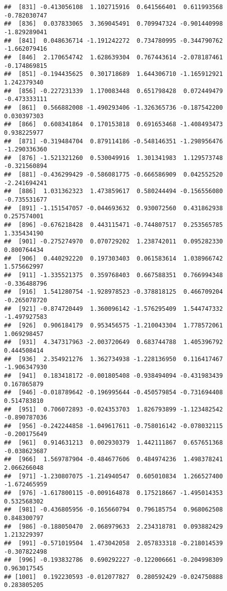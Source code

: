 \documentclass[
]{article}
\begin{document}
\begin{verbatim}
##  [831] -0.413056108  1.102715916  0.641566401  0.611993568 -0.782030747
##  [836]  0.037833065  3.369045491  0.709947324 -0.901440998 -1.829289041
##  [841]  0.048636714 -1.191242272  0.734780995 -0.344790762 -1.662079416
##  [846]  2.170654742  1.628639304  0.767443614 -2.078187461 -0.174869815
##  [851] -0.194435625  0.301718689  1.644306710 -1.165912921  1.242379340
##  [856] -0.227231339  1.170083448  0.651798428  0.072449479 -0.473333111
##  [861]  0.566882008 -1.490293406 -1.326365736 -0.187542200  0.030397303
##  [866]  0.608341864  0.170153818  0.691653468 -1.408493473  0.938225977
##  [871] -0.319484704  0.879114186 -0.548146351 -1.298956476 -1.290336360
##  [876] -1.521321260  0.530049916  1.301341983  1.129573748 -0.321560894
##  [881] -0.436299429 -0.586081775 -0.666586909  0.042552520 -2.241694241
##  [886]  1.031362323  1.473859617  0.580244494 -0.156556080 -0.735531677
##  [891] -1.151547057 -0.044693632  0.930072560  0.431862938  0.257574001
##  [896] -0.676218428  0.443115471 -0.744807517  0.253565785  1.335434190
##  [901] -0.275274970  0.070729202  1.238742011  0.095282330  0.800764434
##  [906]  0.440292220  0.197303403  0.061583614  1.038966742  1.575662997
##  [911] -1.335521375  0.359768403  0.667588351  0.766994348 -0.336488796
##  [916]  1.541280754 -1.928978523 -0.378818125  0.466709204 -0.265078720
##  [921] -0.874720449  1.360096142 -1.576295409  1.544747332 -1.497927583
##  [926]  0.906184179  0.953456575 -1.210043304  1.778572061  1.069298457
##  [931]  4.347317963 -2.003720649  0.683744788  1.405396792  0.444508414
##  [936]  2.354921276  1.362734938 -1.228136950  0.116417467 -1.906347930
##  [941]  0.183418172 -0.001805408 -0.938494094 -0.431983439  0.167865879
##  [946] -0.018789642 -0.196995644 -0.450579854 -0.731694408  0.514783810
##  [951]  0.706072893 -0.024353703  1.826793899 -1.123482542 -0.890787036
##  [956] -0.242244858 -1.049617611 -0.758016142 -0.078032115 -0.200175649
##  [961]  0.914631213  0.002930379  1.442111867  0.657651368 -0.038623687
##  [966]  1.569787904 -0.484677606  0.484974236  1.498378241  2.066266048
##  [971] -1.230807075 -1.214940547  0.605010834  1.266527400 -1.672465959
##  [976] -1.617800115 -0.009164878  0.175218667 -1.495014353  0.532568302
##  [981] -0.436805956 -0.165660794  0.796185754  0.968062508  0.848300797
##  [986] -0.188050470  2.068979633  2.234318781  0.093882429  1.213229397
##  [991] -0.571019504  1.473042058  2.057833318 -0.218014539 -0.307822498
##  [996] -0.193832786  0.690292227 -0.122006661 -0.204998309  0.963017545
## [1001]  0.192230593 -0.012077827  0.280592429 -0.024750888  0.283805205

\end{verbatim}
\end{document}
